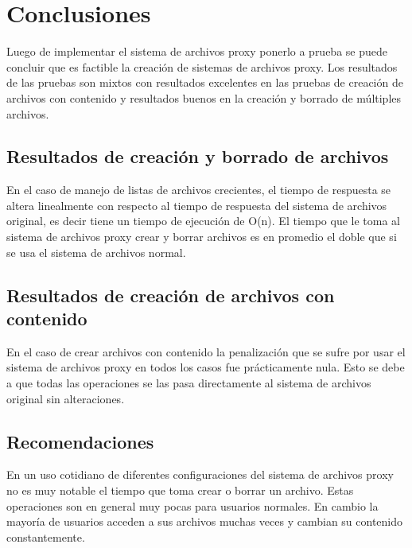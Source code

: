 \def\baselinestretch{1}
\chapter{Conclusiones}
\ifpdf
    \graphicspath{{Conclusions/ConclusionsFigs/PNG/}{Conclusions/ConclusionsFigs/PDF/}{Conclusions/ConclusionsFigs/}}
\else
    \graphicspath{{Conclusions/ConclusionsFigs/EPS/}{Conclusions/ConclusionsFigs/}}
\fi

Luego de implementar el sistema de archivos proxy ponerlo a prueba se puede concluir que es factible la creación de sistemas de archivos proxy. Los resultados de las pruebas son mixtos con resultados excelentes en las pruebas de creación de archivos con contenido y resultados buenos en la creación y borrado de múltiples archivos.

\section{Resultados de creación y borrado de archivos}

En el caso de manejo de listas de archivos crecientes, el tiempo de respuesta se altera linealmente con respecto al tiempo de respuesta del sistema de archivos original, es decir tiene un tiempo de ejecución de O(n). El tiempo que le toma al sistema de archivos proxy crear y borrar archivos es en promedio el doble que si se usa el sistema de archivos normal.

\section{Resultados de creación de archivos con contenido}

En el caso de crear archivos con contenido la penalización que se sufre por usar el sistema de archivos proxy en todos los casos fue prácticamente nula. Esto se debe a que todas las operaciones se las pasa directamente al sistema de archivos original sin alteraciones.

\section{Recomendaciones}

En un uso cotidiano de diferentes configuraciones del sistema de archivos proxy no es muy notable el tiempo que toma crear o borrar un archivo. Estas operaciones son en general muy pocas para usuarios normales. En cambio la mayoría de usuarios acceden a sus archivos muchas veces y cambian su contenido constantemente. 

